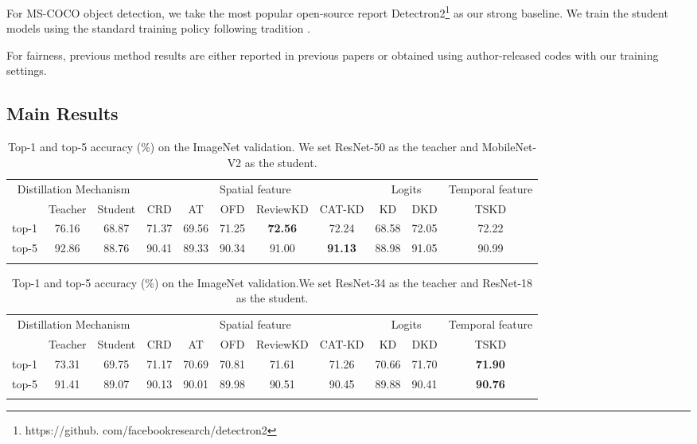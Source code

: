 \documentclass[letterpaper]{article} %
\begin{document}
For MS-COCO object detection, we take the most popular open-source report Detectron2\footnote{https://github.
com/facebookresearch/detectron2} as our strong baseline. We train the student models using the standard training policy following tradition \cite{wang2019distilling}.

For fairness, previous method results are either reported in previous papers or obtained using author-released codes with our training settings.

\subsection{Main Results}

\begin{table}[t]
\centering
\begin{tabular}{@{}ccc|ccccc|cc|c@{}}

\multicolumn{3}{c|}{Distillation Mechanism} &\multicolumn{5}{c|}{Spatial feature} & \multicolumn{2}{c|}{Logits} &Temporal feature\\ \Xhline{1.5pt}
 & Teacher & Student & CRD    & AT     & OFD     & ReviewKD   & CAT-KD    & KD & DKD     & TSKD      \\ \hline
top-1   & 76.16   & 68.87  & 71.37 & 69.56  & 71.25  & \textbf{72.56}   & 72.24  & 68.58  & 72.05  & 72.22                \\
top-5   &92.86    & 88.76  & 90.41      &89.33        & 90.34       & 91.00       & \textbf{91.13}               &88.98     &91.05    &90.99  \\
\hspace*{\fill} \\
\end{tabular}
\caption{Top-1 and top-5 accuracy (\%) on the ImageNet validation. We set ResNet-50 as the teacher and MobileNet-V2 as the student.}
\label{R50tomobile}
\end{table}
\begin{table}[t]
\centering
\begin{tabular}{@{}ccc|ccccc|cc|c@{}}
\multicolumn{3}{c|}{Distillation Mechanism} &\multicolumn{5}{c|}{Spatial feature} & \multicolumn{2}{c|}{Logits} &Temporal feature\\ \Xhline{1.5pt}
 & Teacher & Student & CRD    & AT     & OFD     & ReviewKD   & CAT-KD    & KD & DKD     & TSKD        \\ \hline
top-1   & 73.31   & 69.75   & 71.17 & 70.69 & 70.81 & 71.61 & 71.26   & 70.66  & 71.70 & \textbf{71.90} \\
top-5   & 91.41   & 89.07   & 90.13      &90.01       &89.98       &90.51      & 90.45              &89.88   &90.41   & \textbf{90.76 }             \\
 \\
\end{tabular}
\caption{Top-1 and top-5 accuracy (\%) on the ImageNet validation.We set ResNet-34 as the teacher and ResNet-18 as the student.}
\label{r34tor18}
\end{table}
\end{document}
